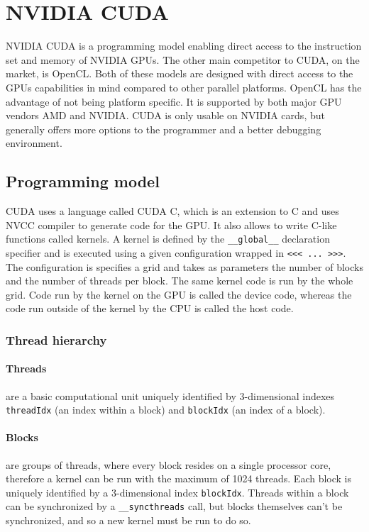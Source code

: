\section{NVIDIA CUDA}

NVIDIA CUDA is a programming model enabling direct access to the instruction set and memory of NVIDIA GPUs. The other main competitor to CUDA, on the market, is OpenCL. Both of these models are designed with direct access to the GPUs capabilities in mind compared to other parallel platforms. OpenCL has the advantage of not being platform specific. It is supported by both major GPU vendors AMD and NVIDIA. CUDA is only usable on NVIDIA cards, but generally offers more options to the programmer and a better debugging environment.

\subsection{Programming model}

CUDA uses a language called CUDA C, which is an extension to C and uses NVCC compiler to generate code for the GPU. It also allows to write C-like functions called kernels. A kernel is defined by the \verb|__global__| declaration specifier and is executed using a given configuration wrapped in \verb|<<< ... >>>|. The configuration is specifies a grid and takes as parameters the number of blocks and the number of threads per block. The same kernel code is run by the whole grid. Code run by the kernel on the GPU is called the device code, whereas the code run outside of the kernel by the CPU is called the host code.

\subsubsection{Thread hierarchy}\label{subsubsec:thread-hierarchy}

\paragraph{Threads} are a basic computational unit uniquely identified by 3-dimensional indexes \verb|threadIdx| (an index within a block) and \verb|blockIdx| (an index of a block).

\paragraph{Blocks} are groups of threads, where every block resides on a single processor core, therefore a kernel can be run with the maximum of 1024 threads. Each block is uniquely identified by a 3-dimensional index \verb|blockIdx|. Threads within a block can be synchronized by a \verb|__syncthreads| call, but blocks themselves can't be synchronized, and so a new kernel must be run to do so.

